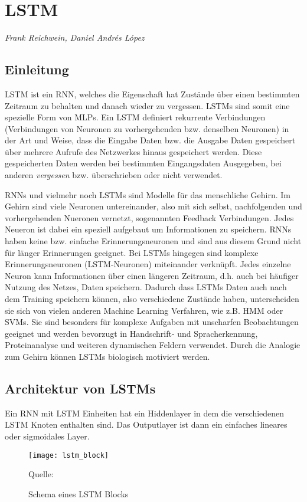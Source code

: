 \section{\acl{LSTM}}
\textit{Frank Reichwein, Daniel Andrés López }

\subsection{Einleitung}
\ac{LSTM} ist ein \ac{RNN}, welches die Eigenschaft hat Zustände über einen
bestimmten Zeitraum zu behalten und danach wieder zu vergessen. \acp{LSTM} sind
somit eine spezielle Form von \acp{MLP}. Ein \ac{LSTM} definiert rekurrente
Verbindungen (Verbindungen von Neuronen zu vorhergehenden bzw. denselben
Neuronen) in der Art und Weise, dass die Eingabe Daten bzw.
die Ausgabe Daten gespeichert über mehrere Aufrufe des Netzwerkes hinaus
gespeichert werden. Diese gespeicherten Daten werden bei bestimmten
Eingangsdaten Ausgegeben, bei anderen \textit{vergessen} bzw. überschrieben oder
nicht verwendet. 
 
\acp{RNN} und vielmehr noch \acp{LSTM} sind Modelle für das menschliche Gehirn.
Im Gehirn sind viele Neuronen untereinander, also mit sich selbst, nachfolgenden
und vorhergehenden Nueronen vernetzt, sogenannten Feedback Verbindungen. Jedes
Neueron ist dabei ein speziell aufgebaut um Informationen zu speichern.
\acp{RNN} haben keine bzw. einfache Erinnerungsneuronen und sind aus diesem
Grund nicht für länger Erinnerungen geeignet. Bei \acp{LSTM} hingegen sind
komplexe Erinnerungsneuronen (\ac{LSTM}-Neuronen) miteinander verknüpft. Jedes
einzelne Neuron kann Informationen über einen längeren Zeitraum, d.h. auch bei
häufiger Nutzung des Netzes, Daten speichern. Dadurch dass \acp{LSTM} Daten auch
nach dem Training speichern können, also verschiedene Zustände haben,
unterscheiden sie sich von vielen anderen Machine Learning Verfahren, wie z.B.
\ac{HMM} oder \acp{SVM}. Sie sind besonders für komplexe Aufgaben mit unscharfen
Beobachtungen geeignet und werden bevorzugt in Handschrift- und Spracherkennung,
Proteinanalyse und weiteren dynamischen Feldern verwendet. Durch die Analogie
zum Gehirn können \acp{LSTM} biologisch motiviert werden.
 
\subsection{Architektur von \aclp{LSTM}}
Ein \ac{RNN} mit \ac{LSTM} Einheiten hat ein Hiddenlayer in dem die
verschiedenen \ac{LSTM} Knoten enthalten sind. Das Outputlayer ist dann ein
einfaches lineares oder sigmoidales Layer.  
\begin{figure}[h]
	\begin{center}
	\texttt{[image: lstm\_block]}
	\caption{Schema eines \acs{LSTM} Blocks}
	Quelle: \cite{WIKI2013}
	\label{fig:lstm_block}
	\end{center}
\end{figure}

